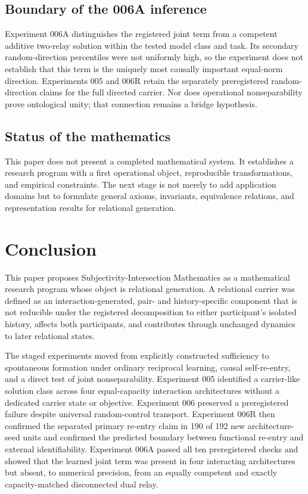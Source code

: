 \documentclass[11pt,a4paper]{article}
\begin{document}
\subsection{Boundary of the 006A inference}

Experiment 006A distinguishes the registered joint term from a competent additive two-relay solution within the tested model class and task. Its secondary random-direction percentiles were not uniformly high, so the experiment does not establish that this term is the uniquely most causally important equal-norm direction. Experiments 005 and 006R retain the separately preregistered random-direction claims for the full directed carrier. Nor does operational nonseparability prove ontological unity; that connection remains a bridge hypothesis.

\subsection{Status of the mathematics}

This paper does not present a completed mathematical system. It establishes a research program with a first operational object, reproducible transformations, and empirical constraints. The next stage is not merely to add application domains but to formulate general axioms, invariants, equivalence relations, and representation results for relational generation.

\section{Conclusion}

This paper proposes Subjectivity-Intersection Mathematics as a mathematical research program whose object is relational generation. A relational carrier was defined as an interaction-generated, pair- and history-specific component that is not reducible under the registered decomposition to either participant's isolated history, affects both participants, and contributes through unchanged dynamics to later relational states.

The staged experiments moved from explicitly constructed sufficiency to spontaneous formation under ordinary reciprocal learning, causal self-re-entry, and a direct test of joint nonseparability. Experiment 005 identified a carrier-like solution class across four equal-capacity interaction architectures without a dedicated carrier state or objective. Experiment 006 preserved a preregistered failure despite universal random-control transport. Experiment 006R then confirmed the separated primary re-entry claim in 190 of 192 new architecture-seed units and confirmed the predicted boundary between functional re-entry and external identifiability. Experiment 006A passed all ten preregistered checks and showed that the learned joint term was present in four interacting architectures but absent, to numerical precision, from an equally competent and exactly capacity-matched disconnected dual relay.
\end{document}
